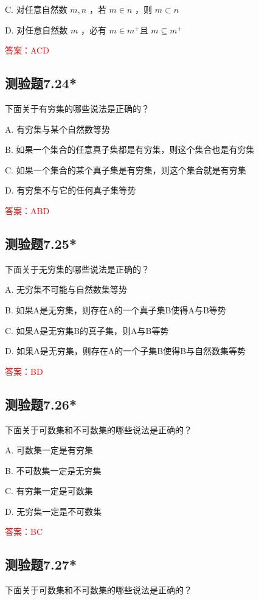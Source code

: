 \documentclass[UTF8, heading=true]{ctexart}
\begin{document}
C. 
对任意自然数 $m, n$ ，若 $m \in n$ ，则 $m \subset n$

D. 
对任意自然数 $m$ ，必有 $m \in m^{+}$且 $m \subseteq m^{+}$

\textcolor{red}{答案：ACD}

\subsection{测验题7.24*}

下面关于有穷集的哪些说法是正确的？

A. 有穷集与某个自然数等势

B. 如果一个集合的任意真子集都是有穷集，则这个集合也是有穷集

C. 如果一个集合的某个真子集是有穷集，则这个集合就是有穷集

D. 有穷集不与它的任何真子集等势

\textcolor{red}{答案：ABD}

\subsection{测验题7.25*}

下面关于无穷集的哪些说法是正确的？

A. 无穷集不可能与自然数集等势

B. 如果A是无穷集，则存在A的一个真子集B使得A与B等势

C. 如果A是无穷集B的真子集，则A与B等势

D. 如果A是无穷集，则存在A的一个子集B使得B与自然数集等势

\textcolor{red}{答案：BD}


\subsection{测验题7.26*}

下面关于可数集和不可数集的哪些说法是正确的？

A. 可数集一定是有穷集

B. 不可数集一定是无穷集

C. 有穷集一定是可数集

D. 无穷集一定是不可数集

\textcolor{red}{答案：BC}

\subsection{测验题7.27*}

下面关于可数集和不可数集的哪些说法是正确的？
\end{document}
